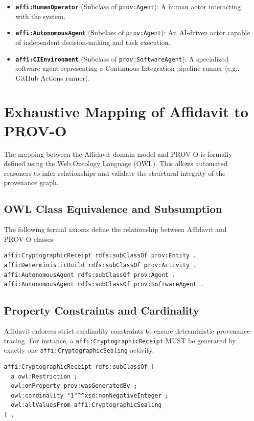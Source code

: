 \begin{itemize}
    \item \textbf{\texttt{affi:HumanOperator}} (Subclass of \texttt{prov:Agent}): A human actor interacting with the system.
    \item \textbf{\texttt{affi:AutonomousAgent}} (Subclass of \texttt{prov:Agent}): An AI-driven actor capable of independent decision-making and task execution.
    \item \textbf{\texttt{affi:CIEnvironment}} (Subclass of \texttt{prov:SoftwareAgent}): A specialized software agent representing a Continuous Integration pipeline runner (e.g., GitHub Actions runner).
\end{itemize}

\section{Exhaustive Mapping of Affidavit to PROV-O}

The mapping between the Affidavit domain model and PROV-O is formally defined using the Web Ontology Language (OWL). This allows automated reasoners to infer relationships and validate the structural integrity of the provenance graph.

\subsection{OWL Class Equivalence and Subsumption}

The following formal axioms define the relationship between Affidavit and PROV-O classes:

\begin{verbatim}
affi:CryptographicReceipt rdfs:subClassOf prov:Entity .
affi:DeterministicBuild rdfs:subClassOf prov:Activity .
affi:AutonomousAgent rdfs:subClassOf prov:Agent .
affi:AutonomousAgent rdfs:subClassOf prov:SoftwareAgent .
\end{verbatim}

\subsection{Property Constraints and Cardinality}

Affidavit enforces strict cardinality constraints to ensure deterministic provenance tracing. For instance, a \texttt{affi:CryptographicReceipt} MUST be generated by exactly one \texttt{affi:CryptographicSealing} activity.

\begin{verbatim}
affi:CryptographicReceipt rdfs:subClassOf [
  a owl:Restriction ;
  owl:onProperty prov:wasGeneratedBy ;
  owl:cardinality "1"^^xsd:nonNegativeInteger ;
  owl:allValuesFrom affi:CryptographicSealing
] .
\end{verbatim}

